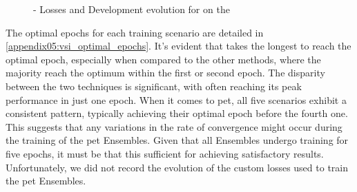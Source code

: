 \begin{figure}[ht]
    \centering
    \hfill
    \hfill
    \caption{\petThousand{} - Losses and Development \fTwo{} evolution for \bertroberta{} on the \trafilaturaTitle{}}
    \label{fig:07_vsi_sample_training_logs_pet_1000}
\end{figure}

The optimal epochs for each training scenario are detailed in \appendixname{} \ref{appendix05:vsi_optimal_epochs}. It's evident that \unbalanced{} takes the longest to reach the optimal epoch, especially when compared to the other methods, where the majority reach the optimum within the first or second epoch. The disparity between the two \finetuning{} techniques is significant, with \balanced{} often reaching its peak performance in just one epoch. When it comes to \gls{pet}, all five scenarios exhibit a consistent pattern, typically achieving their optimal epoch before the fourth one. This suggests that any variations in the rate of convergence might occur during the training of the \gls{pet} Ensembles. Given that all Ensembles undergo training for five epochs, it must be that this sufficient for achieving satisfactory results. Unfortunately, we did not record the evolution of the custom losses used to train the \gls{pet} Ensembles.

